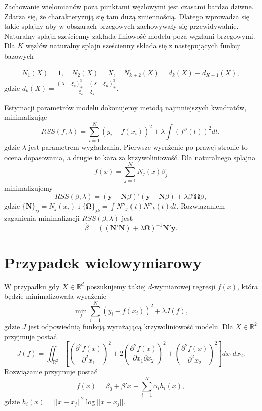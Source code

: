 \documentclass[
]{book}
\theoremstyle{plain}
\theoremstyle{definition}
\theoremstyle{definition}
\theoremstyle{definition}
\theoremstyle{definition}
\theoremstyle{definition}
\theoremstyle{remark}
\begin{document}
Zachowanie wielomianów poza punktami węzłowymi jest czasami bardzo dziwne. Zdarza się, że charakteryzują się tam dużą zmiennością. Dlatego wprowadza się takie splajny aby w obszarach brzegowych zachowywały się przewidywalnie.
Naturalny splajn sześcienny zakłada liniowość modelu poza węzłami brzegowymi. Dla \(K\) węzłów naturalny splajn sześcienny składa się z następujących funkcji bazowych

\begin{gather}
    N_1(X)=1,\quad N_2(X)=X,\quad N_{k+2}(X)=d_k(X)-d_{K-1}(X),
\end{gather}
gdzie \(d_k(X)=\frac{(X-\xi_k)^3_+-(X-\xi_K)^3_+}{\xi_K-\xi_k}.\)

Estymacji parametrów modelu dokonujemy metodą najmniejszych kwadratów, minimalizując
\begin{equation}
    RSS(f,\lambda) = \sum_{i=1}^N(y_i-f(x_i))^2+\lambda\int(f''(t))^2dt,
\end{equation}
gdzie \(\lambda\) jest parametrem wygładzania. Pierwsze wyrażenie po prawej stronie to ocena dopasowania, a drugie to kara za krzywoliniowość.
Dla naturalnego splajna
\begin{equation}
    f(x)=\sum_{j=1}^NN_j(x)\beta_j
\end{equation}
minimalizujemy
\begin{equation}
    RSS(\beta, \lambda)=(\boldsymbol y -\boldsymbol N\beta)'(\boldsymbol y-\boldsymbol N\beta)+\lambda\beta'\boldsymbol \Omega \beta,
\end{equation}
gdzie \(\{\boldsymbol N\}_{ij}= N_j(x_i)\) i \(\{\boldsymbol \Omega\}_{jk}=\int N''_j(t)N''_k(t)dt\). Rozwiązaniem zaganienia minimalizacji \(RSS(\beta,\lambda)\) jest
\begin{equation}
    \hat{\beta}=((\boldsymbol N'\boldsymbol N)+\lambda\boldsymbol \Omega)^{-1}\boldsymbol N'\boldsymbol y.
\end{equation}

\section{Przypadek wielowymiarowy}\label{przypadek-wielowymiarowy}

W przypadku gdy \(X\in \mathbb{R}^d\) poszukujemy takiej \(d\)-wymiarowej regresji \(f(x)\), która będzie minimalizowała wyrażenie
\begin{equation}
    \min_f\sum_{i=1}^N(y_i-f(x_i))^2+\lambda J(f),
\end{equation}
gdzie \(J\) jest odpowiednią funkcją wyrażającą krzywoliniowość modelu. Dla \(X\in \mathbb{R}^2\) przyjmuje postać
\begin{equation}
    J(f)=\iint_{\mathbb{R}^2}\left[\left(\frac{\partial^2 f(x)}{\partial^2 x_1}\right)^2+2\left(\frac{\partial^2 f(x)}{\partial x_1\partial x_2}\right)^2+
    \left(\frac{\partial^2 f(x)}{\partial^2 x_2}\right)^2\right]dx_1dx_2.
\end{equation}
Rozwiązanie przyjmuje postać
\begin{equation}
    f(x) = \beta_0+\beta'x+\sum_{i=1}^N \alpha_ih_i(x),
\end{equation}
gdzie \(h_i(x)=||x-x_j||^2\log||x-x_j||\).
\end{document}
